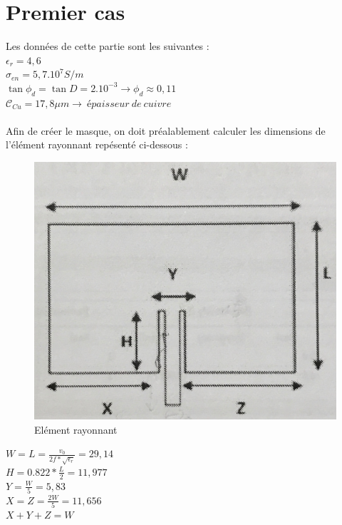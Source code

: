 \documentclass[16pt,a4paper,oneside,titlepage]{report}
\begin{document}
\section{Premier cas}
Les données de cette partie sont les suivantes :\\\indent
$\epsilon_{r}=4,6 $\\\indent
$\sigma _{en}=5,7.10^7 S/m $\\\indent
$\tan\phi _{d}=\tan D=2.10^{-3} \rightarrow \phi _{d}\approx0,11 $\\\indent
$\mathcal{C}_{Cu} =17,8\mu m \rightarrow \:épaisseur \:de \:cuivre$\\\\
Afin de créer le masque, on doit préalablement calculer les dimensions de l'élément rayonnant repésenté ci-dessous :
\begin{figure}[h]
\center
\includegraphics[scale=0.04]{Images/element_rayonnant.jpg}
\caption{Elément rayonnant}
\end{figure}

$W=L= \frac{v_{0}}{2f*\sqrt{\epsilon_{r}}}=29,14$\\\indent
$H= 0.822*\frac{L}{2}=11,977$\\\indent
$Y= \frac{W}{5}=5,83$\\\indent
$X=Z= \frac{2W}{5}=11,656$\\\indent
$X+Y+Z=W$\\\\
\end{document}
